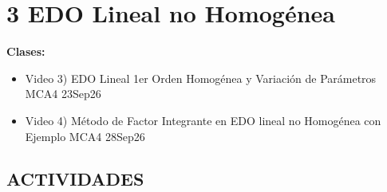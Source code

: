 \section{3 EDO Lineal no Homogénea}

\begin{tcolorbox}[enunciado]
\textbf{Clases:}
\begin{itemize}[leftmargin=*]
    \item Video 3) EDO Lineal 1er Orden Homogénea y Variación de Parámetros MCA4 23Sep26
    \item Video 4) Método de Factor Integrante en EDO lineal no Homogénea con Ejemplo MCA4 28Sep26
\end{itemize}
\end{tcolorbox}

\subsection*{ACTIVIDADES}

